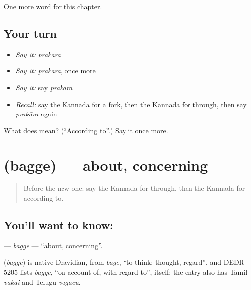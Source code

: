\begin{grammarlens}[title={What you've built}]
One more word for this chapter.
\end{grammarlens}

\subsection*{Your turn}
\begin{itemize}
\raggedright
  \item \emph{Say it:} \emph{prakāra}
  \item \emph{Say it:} \emph{prakāra}, once more
  \item \emph{Say it:} say \emph{prakāra}
  \item \emph{Recall:} say the Kannada for a fork, then the Kannada for through, then say \emph{prakāra} again
\end{itemize}

\begin{tcolorbox}[breakable,colback=teal!4,colframe=teal!35!black,title={Before you move on}]
What does  mean? (\textquotedblleft{}According to\textquotedblright{}.) Say it once more.
\end{tcolorbox}
\section[\texorpdfstring{\kn{ಬಗ್ಗೆ} (bagge)}{ಬಗ್ಗೆ (bagge)}]{ (bagge) — about, concerning}

\label{lesson:KA-C215-bagge}



\begin{quote}
Before the new one: say the Kannada for through, then the Kannada for according to.
\end{quote}

\subsection*{You'll want to know: }
\textbf{} — \emph{bagge} — \textquotedblleft{}about, concerning\textquotedblright{}.

\begin{cousinweb}
\textbf{} (\emph{bagge}) is native Dravidian, from \emph{bage}, \textquotedblleft{}to think; thought, regard\textquotedblright{}, and DEDR 5205 lists \emph{bagge}, \textquotedblleft{}on account of, with regard to\textquotedblright{}, itself; the entry also has Tamil \emph{vakai} and Telugu \emph{vagacu}.
\end{cousinweb}

